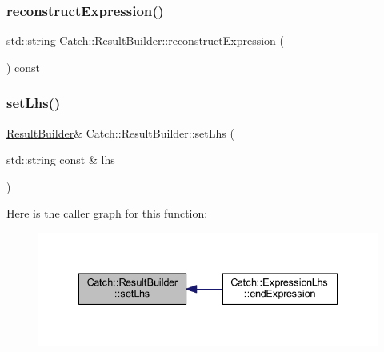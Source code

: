 \hypertarget{class_catch_1_1_result_builder_aebe098f8d206a89995076b95a3348195}{}\label{class_catch_1_1_result_builder_aebe098f8d206a89995076b95a3348195} 
\subsubsection{\texorpdfstring{reconstruct\+Expression()}{reconstructExpression()}}
{\footnotesize\ttfamily std\+::string Catch\+::\+Result\+Builder\+::reconstruct\+Expression (\begin{DoxyParamCaption}{ }\end{DoxyParamCaption}) const}

\hypertarget{class_catch_1_1_result_builder_a5de584deec90fc6b7cc5bcf9eb636442}{}\label{class_catch_1_1_result_builder_a5de584deec90fc6b7cc5bcf9eb636442} 
\subsubsection{\texorpdfstring{set\+Lhs()}{setLhs()}}
{\footnotesize\ttfamily \hyperlink{class_catch_1_1_result_builder}{Result\+Builder}\& Catch\+::\+Result\+Builder\+::set\+Lhs (\begin{DoxyParamCaption}\item[{std\+::string const \&}]{lhs }\end{DoxyParamCaption})}

Here is the caller graph for this function\+:\nopagebreak
\begin{figure}[H]
\begin{center}
\leavevmode
\includegraphics[width=335pt]{class_catch_1_1_result_builder_a5de584deec90fc6b7cc5bcf9eb636442_icgraph}
\end{center}
\end{figure}
\hypertarget{class_catch_1_1_result_builder_a8232ed051ed7f6adfbc152c98aa1dc0c}{}\label{class_catch_1_1_result_builder_a8232ed051ed7f6adfbc152c98aa1dc0c} 
